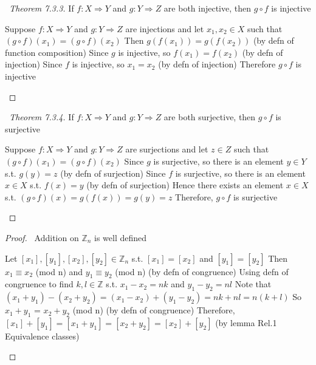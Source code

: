 \documentclass[a4paper]{article}
\theoremstyle{definition}
\begin{document}
\begin{proof}[\proofname\ Theorem 7.3.3] If $f: X \Rightarrow Y$ and $g: Y \Rightarrow Z$ are both injective, then $g \circ f$ is injective
  \begin{numpf}
    \pfln Suppose $f: X \Rightarrow Y$ and $g: Y \Rightarrow Z$ are injections and let $x_1, x_2 \in X$ such that $(g \circ f)(x_1) = (g \circ f)(x_2)$
    \pfln Then $g(f(x_1)) = g(f(x_2))$ (by defn of function composition)
    \pfln Since $g$ is injective, so $f(x_1) = f(x_2)$ (by defn of injection)
    \pfln Since $f$ is injective, so $x_1 = x_2$ (by defn of injection)
    \pfln Therefore $g \circ f$ is injective
  \end{numpf}
\end{proof}

\begin{proof}[\proofname\ Theorem 7.3.4] If $f: X \Rightarrow Y$ and $g: Y \Rightarrow Z$ are both surjective, then $g \circ f$ is surjective
  \begin{numpf}
    \pfln Suppose $f: X \Rightarrow Y$ and $g: Y \Rightarrow Z$ are surjections and let $z \in Z$ such that $(g \circ f)(x_1) = (g \circ f)(x_2)$
    \pfln Since $g$ is surjective, so there is an element $y \in Y$ s.t. $g(y) = z$ (by defn of surjection)
    \pfln Since $f$ is surjective, so there is an element $x \in X$ s.t. $f(x) = y$ (by defn of surjection)
    \pfln Hence there exists an element $x \in X$ s.t. $(g \circ f)(x) = g(f(x)) = g(y) = z$
    \pfln Therefore, $g \circ f$ is surjective
  \end{numpf}
\end{proof}

\begin{proof}{\proofname\ Addition on $\mathbb{Z}_n$ is well defined}
  \begin{numpf}
    \pfln Let $[x_1], [y_1], [x_2], [y_2] \in \mathbb{Z}_n$ s.t. $[x_1] = [x_2]$ and $[y_1] = [y_2]$
    \pfln Then $x_1 \equiv x_2$ (mod n) and $y_1 \equiv y_2$ (mod n) (by defn of congruence)
    \pfln Using defn of congruence to find $k, l \in \mathbb{Z}$ s.t. $x_1 - x_2 = nk$ and $y_1 - y_2 = nl$
    \pfln Note that $(x_1 + y_1) - (x_2 + y_2) = (x_1 - x_2) + (y_1 - y_2) = nk + nl = n(k+l)$
    \pfln So $x_1 + y_1$ = $x_2 + y_2$ (mod n) (by defn of congruence)
    \pfln Therefore, $[x_1] + [y_1] = [x_1+y_1] = [x_2+y_2] = [x_2] + [y_2]$ (by lemma Rel.1 Equivalence classes)
  \end{numpf}
\end{proof}
\end{document}
